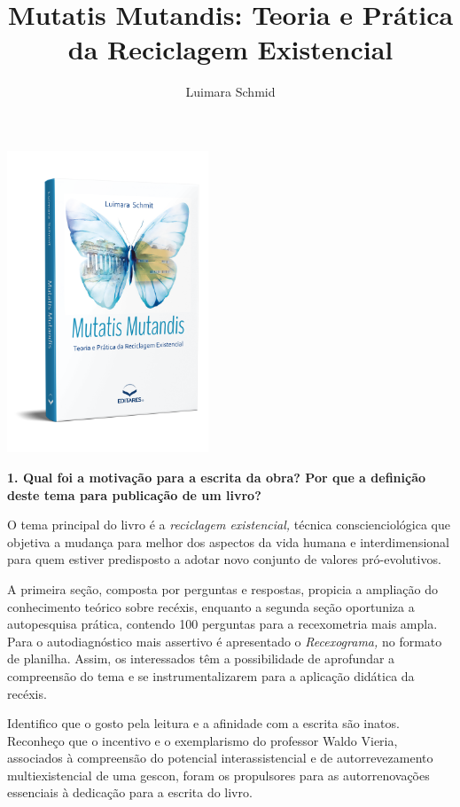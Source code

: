 \documentclass{gescons}
\author{Luimara Schmid}
\title{Mutatis Mutandis: Teoria e Prática da Reciclagem Existencial}
\begin{document}
    \makeentrevistatitle

    \begin{multicols}{2}

\begin{center}
    \includegraphics[width=6cm]{articles/entrevista/mockups/Luimara.png}
\end{center}

\textbf{1. Qual foi a motivação para a escrita da obra? Por que a definição deste tema para publicação de um livro?}


O tema principal do livro é a \emph{reciclagem existencial,} técnica conscienciológica que objetiva a mudança para melhor dos aspectos da vida humana e interdimensional para quem estiver predisposto a adotar novo conjunto de valores pró-evolutivos.

A primeira seção, composta por perguntas e respostas, propicia a ampliação do conhecimento teórico sobre recéxis, enquanto a segunda seção oportuniza a autopesquisa prática, contendo 100 perguntas para a recexometria mais ampla. Para o autodiagnóstico mais assertivo é apresentado o \emph{Recexograma,} no formato de planilha. Assim, os interessados têm a possibilidade de aprofundar a compreensão do tema e se instrumentalizarem para a aplicação didática da recéxis.

Identifico que o gosto pela leitura e a afinidade com a escrita são inatos. Reconheço que o incentivo e o exemplarismo do professor Waldo Vieria, associados à compreensão do potencial interassistencial e de autorrevezamento multiexistencial de uma gescon, foram os propulsores para as autorrenovações essenciais à dedicação para a escrita do livro.


\end{multicols}
\end{document}

